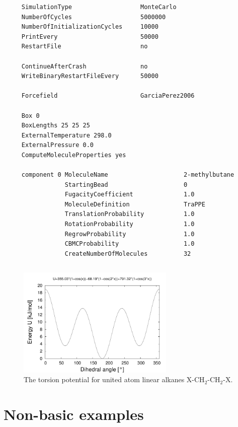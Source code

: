 \begin{tiny}
\begin{verbatim}
     SimulationType                   MonteCarlo
     NumberOfCycles                   5000000
     NumberOfInitializationCycles     10000
     PrintEvery                       50000
     RestartFile                      no
     
     ContinueAfterCrash               no
     WriteBinaryRestartFileEvery      50000
     
     Forcefield                       GarciaPerez2006
     
     Box 0
     BoxLengths 25 25 25
     ExternalTemperature 298.0
     ExternalPressure 0.0
     ComputeMoleculeProperties yes
     
     component 0 MoleculeName                     2-methylbutane
                 StartingBead                     0
                 FugacityCoefficient              1.0
                 MoleculeDefinition               TraPPE
                 TranslationProbability           1.0
                 RotationProbability              1.0
                 RegrowProbability                1.0
                 CBMCProbability                  1.0
                 CreateNumberOfMolecules          32
\end{verbatim}
\end{tiny}

\begin{tiny}
\begin{verbatim}
\end{verbatim}
\end{tiny}

\begin{figure}[t]
  \centering
  \includegraphics[width=7.5cm]{./Examples/ButaneUADihedral.pdf}
  \caption{The torsion potential for united atom linear alkanes X-CH$_2$-CH$_2$-X.}
  \label{Fig: Butane dihedral}
\end{figure}


\section{Non-basic examples}
